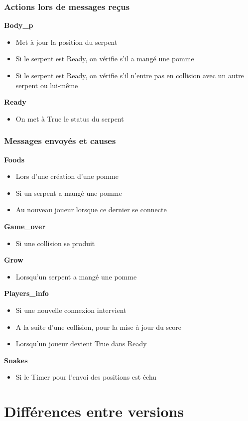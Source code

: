 \documentclass[a4paper]{article}
\begin{document}
\subsubsection{Actions lors de messages reçus}
\textbf{Body\_p}
\begin{itemize}
\item Met à jour la position du serpent
\item Si le serpent est Ready, on vérifie s'il a mangé une pomme
\item Si le serpent est Ready, on vérifie s'il n'entre pas en collision avec un autre serpent ou lui-même
\end{itemize}
\textbf{Ready}
\begin{itemize}
\item On met à True le status du serpent
\end{itemize}

\subsubsection{Messages envoyés et causes}
\textbf{Foods}
\begin{itemize}
\item Lors d'une création d'une pomme
\item Si un serpent a mangé une pomme
\item Au nouveau joueur lorsque ce dernier se connecte
\end{itemize}
\textbf{Game\_over}
\begin{itemize}
\item Si une collision se produit
\end{itemize}
\textbf{Grow}
\begin{itemize}
    \item Lorsqu'un serpent a mangé une pomme
\end{itemize}
\textbf{Players\_info}
\begin{itemize}
    \item Si une nouvelle connexion intervient
    \item A la suite d'une collision, pour la mise à jour du score
    \item Lorsqu'un joueur devient True dans Ready
\end{itemize}
\textbf{Snakes}
\begin{itemize}
    \item Si le Timer pour l'envoi des positions est échu
\end{itemize}

\section{Différences entre versions}
\end{document}
